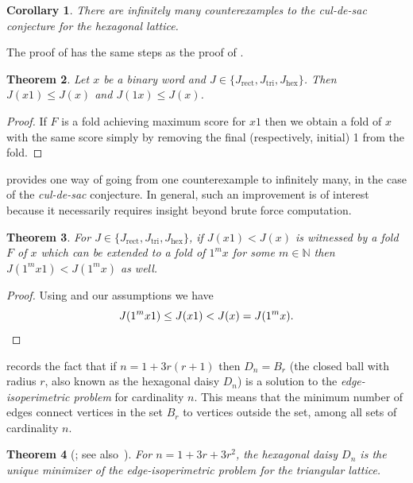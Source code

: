 \documentclass{article}
\newtheorem{theorem}{Theorem}
\newtheorem{corollary}[theorem]{Corollary}
\begin{document}
\begin{corollary}\label{dec31cor}
	There are infinitely many counterexamples to the \emph{cul-de-sac} conjecture for the hexagonal lattice.
\end{corollary}
The proof of  has the same steps as the proof of .


\begin{theorem}\label{nov10-24}
Let $x$ be a binary word and $J\in\{J_{\mathrm{rect}}, J_{\mathrm{tri}}, J_{\mathrm{hex}}\}$. Then $J(x1)\le J(x)$ and $J(1x)\le J(x)$.
\end{theorem}
\begin{proof}
	If $F$ is a fold achieving maximum score for $x1$ then we obtain a fold of $x$ with the same score simply by removing the final (respectively, initial) 1 from the fold.
\end{proof}

 provides one way of going from one counterexample to infinitely many, in the case of the \emph{cul-de-sac} conjecture.
In general, such an improvement is of interest because it necessarily requires insight beyond brute force computation.
\begin{theorem}\label{nov10-24-II}
	For $J\in\{J_{\mathrm{rect}}, J_{\mathrm{tri}}, J_{\mathrm{hex}}\}$, if $J(x1)<J(x)$ is witnessed by a fold $F$ of $x$ which can be extended to a fold of $1^m x$ for some $m\in\mathbb N$
	then $J(1^m x1) < J(1^m x)$ as well.
\end{theorem}
\begin{proof}
	Using  and our assumptions we have
	\[
		J(1^m x1) \le J(x1) < J(x) = J(1^m x).\qedhere
	\]
\end{proof}

 records the fact that if $n = 1 + 3r (r + 1)$ then $D_n=B_r$ (the closed ball with radius $r$, also known as the hexagonal daisy $D_n$) is a solution to the \emph{edge-isoperimetric problem} for cardinality $n$.
This means that the minimum number of edges connect vertices in the set $B_r$ to vertices outside the set, among all sets of cardinality $n$.

\begin{theorem}[{\cite[Corollary 7.1]{MR2035509}; see also~\cite{MR3614767}}]\label{daisy}
	For $n = 1 + 3r + 3r^2$, the hexagonal daisy $D_n$ is the unique minimizer of the edge-isoperimetric problem for the triangular lattice.
\end{theorem}
\end{document}
